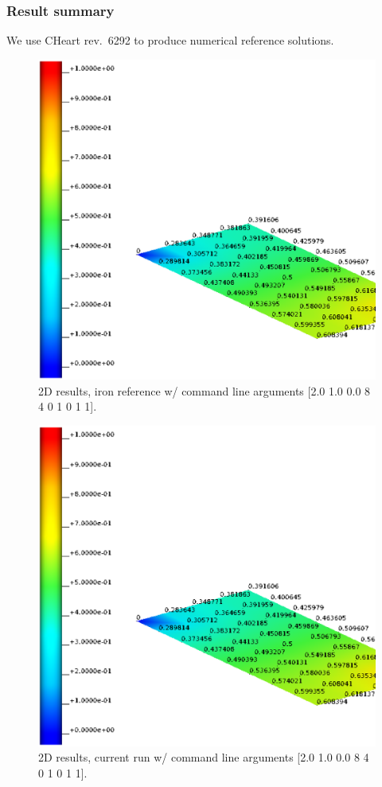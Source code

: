 \subsubsection{Result summary}
%
We use CHeart rev.\ 6292 to produce numerical reference solutions.
%


%
\begin{figure}[h!]
    \centering 
    \includegraphics[width=0.9\columnwidth]{examples/example-0011/doc/figures/iron_reference_2D.eps} 
    \caption{2D results, iron reference w/ command line arguments [2.0 1.0 0.0 8 4 0 1 0 1 1].}
    \label{example-0011-iron-2D-reference-fig}
\end{figure}
%
\begin{figure}[h!]
    \centering 
    \includegraphics[width=0.9\columnwidth]{examples/example-0011/doc/figures/current_run_l2x1x0_n8x4x0_i1_s0.eps} 
    \caption{2D results, current run w/ command line arguments [2.0 1.0 0.0 8 4 0 1 0 1 1].}
    \label{example-0011-current-run-2D-fig}
\end{figure}

